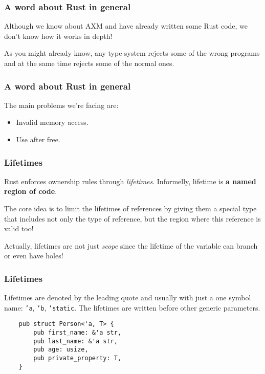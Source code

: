 \documentclass[aspectratio=1610,t]{beamer}
\begin{document}

\begin{frame}[fragile]
\frametitle{A word about Rust in general}
Although we know about AXM and have already written some Rust code, we don't know how it works in depth!

As you might already know, any type system rejects some of the wrong programs and at the same time rejects some of the normal ones.
\end{frame}


\begin{frame}[fragile]
\frametitle{A word about Rust in general}
The main problems we're facing are:

\begin{itemize}
    \item Invalid memory access.
    \item Use after free.
\end{itemize}

\end{frame}


\begin{frame}[fragile]
\frametitle{Lifetimes}
Rust enforces ownership rules through \textit{lifetimes}. Informelly, lifetime is \textbf{a named region of code}.

The core idea is to limit the lifetimes of references by giving them a special type that includes not only the type of reference, but the region where this reference is valid too!

Actually, lifetimes are not just \textit{scope} since the lifetime of the variable can branch or even have holes!
\end{frame}


\begin{frame}[fragile]
\frametitle{Lifetimes}
Lifetimes are denoted by the leading quote and usually with just a one symbol name: \texttt{'a}, \texttt{'b}, \texttt{'static}. The lifetimes are written before other generic parameters.

\begin{verbatim}
    pub struct Person<'a, T> {
        pub first_name: &'a str,
        pub last_name: &'a str,
        pub age: usize,
        pub private_property: T,
    }
\end{verbatim}
\end{frame}
\end{document}
